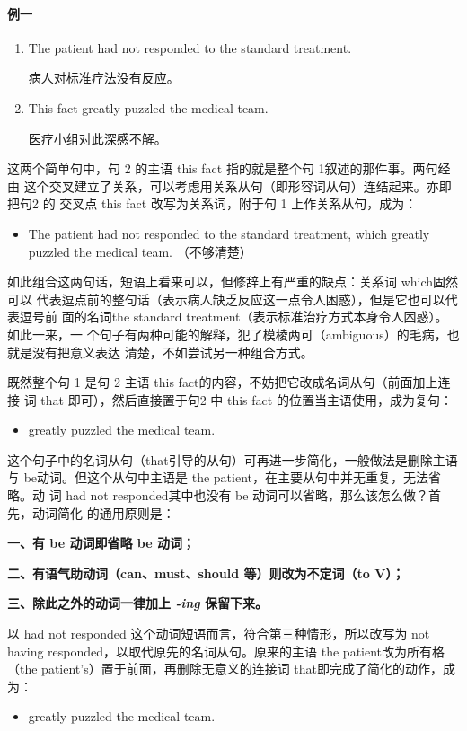 \paragraph{例一}

\begin{enumerate}
\item The patient had not responded to the standard treatment.

  病人对标准疗法没有反应。
\item This fact greatly puzzled the medical team.

  医疗小组对此深感不解。
\end{enumerate}

这两个简单句中，句 2 的主语 this fact 指的就是整个句 1叙述的那件事。两句经由
这个交叉建立了关系，可以考虑用关系从句（即形容词从句）连结起来。亦即把句2 的
交叉点 this fact 改写为关系词，附于句 1 上作关系从句，成为：
\begin{itemize}
\item The patient had not responded to the standard treatment, which greatly
  puzzled the medical team. （不够清楚）
\end{itemize}

如此组合这两句话，短语上看来可以，但修辞上有严重的缺点：关系词 which固然可以
代表逗点前的整句话（表示病人缺乏反应这一点令人困惑），但是它也可以代表逗号前
面的名词the standard treatment（表示标准治疗方式本身令人困惑）。如此一来，一
个句子有两种可能的解释，犯了模棱两可（ambiguous）的毛病，也就是没有把意义表达
清楚，不如尝试另一种组合方式。

既然整个句 1 是句 2 主语 this fact的内容，不妨把它改成名词从句（前面加上连接
词 that 即可），然后直接置于句2 中 this fact 的位置当主语使用，成为复句：
\begin{itemize}
\item {} greatly
  puzzled the medical team.
\end{itemize}
这个句子中的名词从句（that引导的从句）可再进一步简化，一般做法是删除主语
与 be动词。但这个从句中主语是 the patient，在主要从句中并无重复，无法省略。动
词 had not responded其中也没有 be 动词可以省略，那么该怎么做？首先，动词简化
的通用原则是：

\textbf{一、有 be 动词即省略 be 动词；}

\textbf{二、有语气助动词（can、must、should 等）则改为不定词（to V）；}

\textbf{三、除此之外的动词一律加上 \emph{-ing} 保留下来。}

以 had not responded 这个动词短语而言，符合第三种情形，所以改写为 not having
responded，以取代原先的名词从句。原来的主语 the patient改为所有格（the
patient's）置于前面，再删除无意义的连接词 that即完成了简化的动作，成为：
\begin{itemize}
\item {}
  greatly puzzled the medical team.
\end{itemize}

